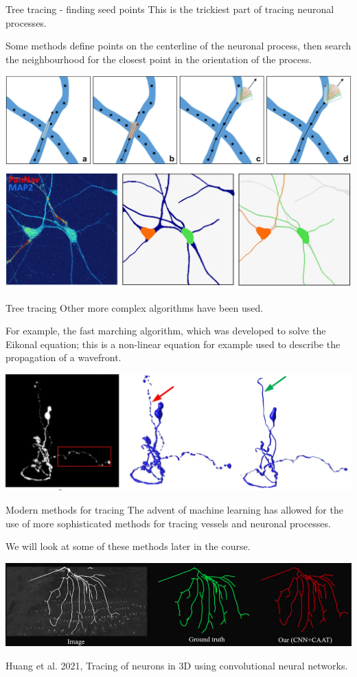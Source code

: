 \documentclass[9pt, aspectratio=169]{beamer}
\begin{document}
\begin{frame}
{Tree tracing - finding seed points}
This is the trickiest part of tracing neuronal processes.

Some methods define points on the centerline of the neuronal process, then search the neighbourhood for the closest point in the orientation of the process.

\centering
\includegraphics[width=.65\textwidth]{Kayasandik_2018_trace_dendrite.jpg}
\end{frame}

\begin{frame}
{Tree tracing}
Other more complex algorithms have been used. 

For example, the fast marching algorithm, which was developed to solve the Eikonal equation; this is a non-linear equation for example used to describe the propagation of a wavefront.

\centering
\includegraphics[width=\textwidth]{FastMarchingYang2018.jpg}
\end{frame}

\begin{frame}
{Modern methods for tracing}
The advent of machine learning has allowed for the use of more sophisticated methods for tracing vessels and neuronal processes.

We will look at some of these methods later in the course.

\centering
\includegraphics[width=\textwidth]{neuron_tracing_CNN_Huang2021.png}

\footnotesize
Huang et al. 2021, Tracing of neurons in 3D using convolutional neural networks. 
\end{frame}
\end{document}
